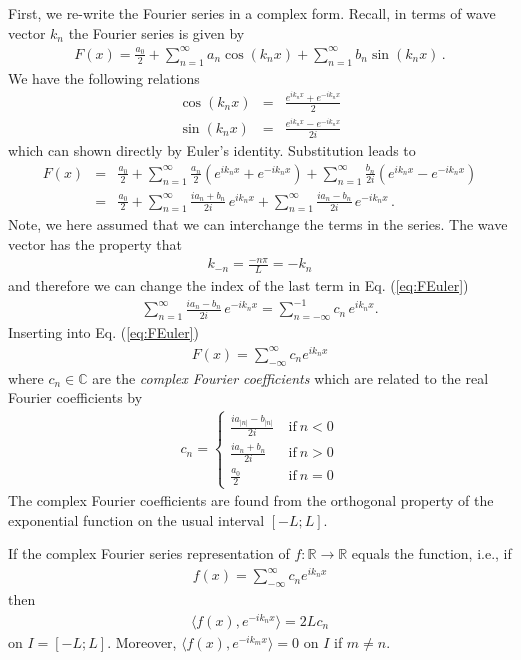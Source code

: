 First, we re-write the Fourier series in a complex form. Recall, in terms of wave vector 
$k_n$ the Fourier series is given by
\begin{eqnarray}
	F(x) = \frac{a_0}{2} + \sum_{n=1}^\infty a_n\cos(k_n x) + \sum_{n=1}^\infty b_n \sin(k_n x) \, .
\end{eqnarray}
We have the following relations
\begin{eqnarray}
	\label{eq:euler2ndidentity}
	\cos(k_n x) &=& \frac{e^{ik_n x} + e^{-ik_nx}}{2}  \nonumber \\
	\sin(k_n x) &=& \frac{e^{ik_n x} - e^{-ik_nx}}{2i}   
\end{eqnarray}
which can shown directly by Euler's identity. Substitution leads to 
\begin{eqnarray}
	F(x) &=&  \frac{a_0}{2}+ \sum_{n=1}^\infty\frac{a_n}{2}(e^{ik_nx}+e^{-ik_nx}) + \sum_{n=1}^\infty \frac{b_n}{2i} ( e^{ik_nx}-e^{-ik_nx}) 
	\nonumber \\
	 &=&  \frac{a_0}{2}+ \sum_{n=1}^\infty\frac{ia_n+b_n}{2i}\, e^{ik_nx} + \sum_{n=1}^\infty \frac{ia_n - b_n}{2i} \, e^{-ik_nx} 
	 \label{eq:FEuler} \, .
\end{eqnarray}
Note, we here assumed that we can interchange the terms in the series. The wave vector has the property that
\begin{eqnarray}
	k_{-n} = \frac{-n\pi}{L} = -k_n
\end{eqnarray}
and therefore we can change the index of the last term in Eq. (\ref{eq:FEuler})
\begin{eqnarray}
	\sum_{n=1}^\infty \frac{ia_n - b_n}{2i} \, e^{-ik_nx} =
	\sum_{n=-\infty}^{-1} c_n \, e^{ik_nx}.  
\end{eqnarray}
Inserting into Eq.
(\ref{eq:FEuler})  
\begin{eqnarray}
	F(x) = \sum_{-\infty}^\infty c_n e^{i k_n x}
\end{eqnarray}
where $c_n \in \mathbb{C}$ are the \emph{complex Fourier coefficients} which 
are related to the real Fourier coefficients by
\begin{eqnarray}
	c_n = \left\{
		\begin{array}{ll}
			\frac{ia_{|n|} - b_{|n|}}{2i} \ & \text{if} \ n < 0 \\
			\frac{ia_{n} + b_{n}}{2i} \ & \text{if} \ n > 0 \\
			\frac{a_0}{2} \ & \text{if} \ n = 0
		\end{array}	
	\right.
\end{eqnarray}
The complex Fourier coefficients are found from the orthogonal property of the exponential function on the
usual interval $[-L;L]$.
\begin{theorem}
	If the complex Fourier series representation of $f:\mathbb{R} \rightarrow \mathbb{R}$ equals the function, i.e., if 
	\begin{eqnarray}
		f(x) = \sum_{-\infty}^\infty c_n e^{i k_n x}
	\end{eqnarray}
	then
	\begin{eqnarray}
		\langle f(x), e^{-ik_n x} \rangle = 2 L c_n  
	\end{eqnarray}
	on $I=[-L; L]$. Moreover, $\langle f(x), e^{-ik_m x} \rangle = 0$ on $I$ if $m \neq n$. 
\end{theorem}

